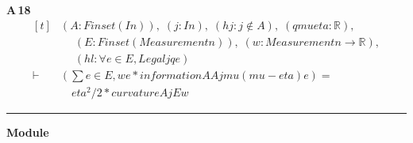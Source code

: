 \noindent\textbf{A\,18}\quad{}
{\footnotesize\[ \begin{aligned}[t]
&(\mathit{A} : \mathit{Finset} (\mathit{I} \mathit{n})),\; (\mathit{j} : \mathit{I} \mathit{n}),\; (\mathit{hj} : \mathit{j} \notin \mathit{A}),\; (\mathit{q} \mathit{mu} \mathit{eta} : \mathbb{R} ),\\
&\quad \; (\mathit{E} : \mathit{Finset} (\mathit{Measurement} \mathit{n})),\; (\mathit{w} : \mathit{Measurement} \mathit{n} \to \mathbb{R} ),\\
&\quad \; (\mathit{hl} : \forall \mathit{e} \in \mathit{E}, \mathit{Legal} \mathit{j} \mathit{q} \mathit{e})\\
\vdash\;&(\textstyle\sum \mathit{e} \in \mathit{E}, \mathit{w} \mathit{e} * \mathit{information} \mathit{A} \mathit{A} \mathit{j} \mathit{mu} (\mathit{mu}-\mathit{eta}) \mathit{e}) =\\
&\quad \mathit{eta}^{2}/2 * \mathit{curvature} \mathit{A} \mathit{j} \mathit{E} \mathit{w}
\end{aligned} \]}

\vspace{4pt}\noindent\rule{\columnwidth}{0.4pt}\par\vspace{2pt}
\noindent\textbf{Module }\par\vspace{3pt}

